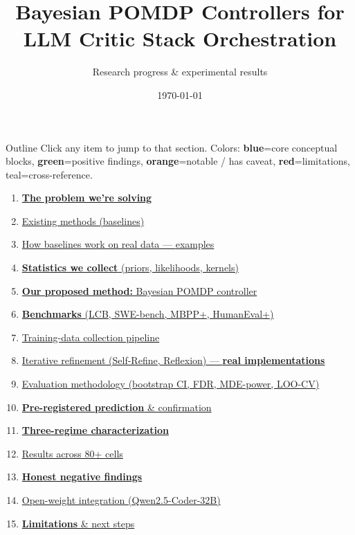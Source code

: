 \documentclass[10pt]{beamer}
\title{\textbf{Bayesian POMDP Controllers for LLM Critic Stack Orchestration}}
\subtitle{Research progress \& experimental results}
\author{}
\institute{MBZUAI}
\date{\today}
\newcommand{\good}[1]{\textcolor{accentGreen}{\textbf{#1}}}
\newcommand{\bad}[1]{\textcolor{accentRed}{\textbf{#1}}}
\newcommand{\warn}[1]{\textcolor{accentOrange}{\textbf{#1}}}
\newcommand{\info}[1]{\textcolor{primaryBlue}{\textbf{#1}}}
\begin{document}

\begin{frame}
\titlepage
\end{frame}

\begin{frame}{Outline}
\small
\textcolor{softGrey}{\scriptsize Click any item to jump to that section.
Colors: \info{blue}=core conceptual blocks, \good{green}=positive findings,
\warn{orange}=notable / has caveat, \bad{red}=limitations,
\textcolor{accentTeal}{teal}=cross-reference.}
\vspace{0.15cm}
\begin{enumerate}\setlength\itemsep{1pt}
\item \hyperlink{out:1}{\info{The problem we're solving}}
\item \hyperlink{out:2}{Existing methods (\textcolor{accentTeal}{baselines})}
\item \hyperlink{out:3}{How baselines work on real data --- \textcolor{accentTeal}{examples}}
\item \hyperlink{out:4}{\info{Statistics we collect} (priors, likelihoods, kernels)}
\item \hyperlink{out:5}{\info{Our proposed method:} Bayesian POMDP controller}
\item \hyperlink{out:6}{\info{Benchmarks} (LCB, SWE-bench, MBPP+, HumanEval+)}
\item \hyperlink{out:7}{Training-data collection pipeline}
\item \hyperlink{out:8}{Iterative refinement (Self-Refine, Reflexion) --- \warn{real implementations}}
\item \hyperlink{out:9}{Evaluation methodology (bootstrap CI, FDR, MDE-power, LOO-CV)}
\item \hyperlink{out:10}{\good{Pre-registered prediction} \& confirmation}
\item \hyperlink{out:11}{\good{Three-regime characterization}}
\item \hyperlink{out:12}{Results across 80+ cells}
\item \hyperlink{out:13}{\warn{Honest negative findings}}
\item \hyperlink{out:14}{Open-weight integration (Qwen2.5-Coder-32B)}
\item \hyperlink{out:15}{\bad{Limitations} \& next steps}
\end{enumerate}
\end{frame}
\end{document}
